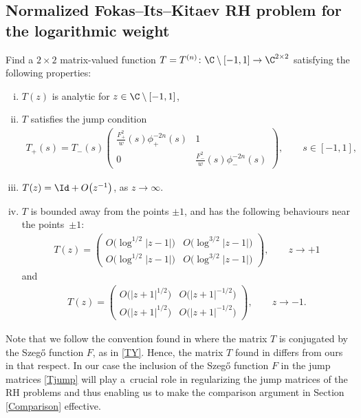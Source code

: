 \subsection{Normalized Fokas--Its--Kitaev RH problem for the logarithmic weight}
Find a $2\times2$ matrix-valued function $T = T^{(n)} \colon \C \setminus [-1,1] \to \C^{2\times2}$ satisfying the following properties:
\begin{enumerate}[(i)]\itemsep=0pt
 \item $T(z)$ is analytic for $z \in \C \setminus [-1,1]$,
 \item $T$ satisfies the jump condition
 \begin{align}\label{Tjump}
 T_+(s) = T_-(s) \begin{pmatrix}
 \frac{F_+^2}{w}(s)\phi_+^{-2n}(s) & 1
 \\
 0 & \frac{F_-^2}{w}(s)\phi_-^{-2n}(s)
 \end{pmatrix}, \qquad s\in [-1,1],
 \end{align}
\item $T(z) = \Id + O\big(z^{-1}\big)$, as $z \rightarrow \infty$.
\item $T$ is bounded away from the points $\pm 1$, and has the following behaviours near the points~$\pm1$:
\begin{align*}
 T(z) = \begin{pmatrix}
 O\big(\log^{1/2}|z-1|\big) & O\big(\log^{3/2}|z-1|\big)
 \\
 O\big(\log^{1/2}|z-1|\big) & O\big(\log^{3/2}|z-1|\big)
 \end{pmatrix}, \qquad z\to +1
\end{align*}
and
\begin{align}\label{Tjump-1}
 T(z) = \begin{pmatrix}
 O\big(|z+1|^{1/2}\big) & O\big(|z+1|^{-1/2}\big)
 \\
 O\big(|z+1|^{1/2}\big) & O\big(|z+1|^{-1/2}\big)
 \end{pmatrix}, \qquad z \to -1.
\end{align}
\end{enumerate}
Note that we follow the convention found in \cite{CD} where the matrix $T$ is conjugated by the Szeg\H{o} function $F$, as in \eqref{TY}. Hence, the matrix $T$ found in \cite[equation~(3.1)]{KMVV} differs from ours in that respect. In our case the inclusion of the Szeg\H{o} function $F$ in the jump matrices \eqref{Tjump} will play a~crucial role in regularizing the jump matrices of the RH problems and thus enabling us to make the comparison argument in Section \ref{Comparison} effective.

